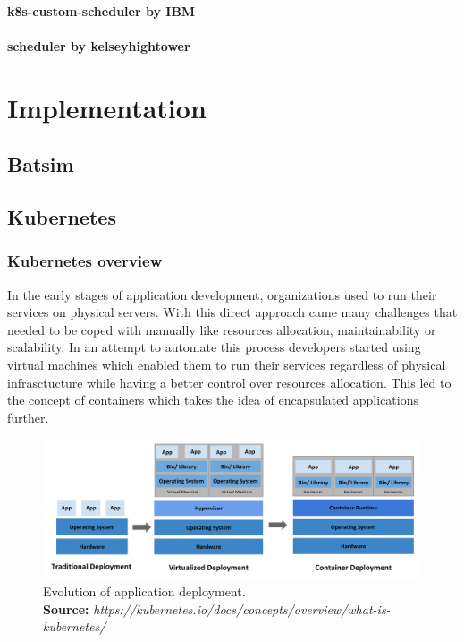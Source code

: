\documentclass[12pt, a4paper]{memoir}
\newcommand*{\captionsource}[2]{%
    \caption[{#1}]{%
        #1%
        \\\hspace{\linewidth}%
	\textbf{Source:} \textit{#2}%
    }%
}
\begin{document}
\subsubsection*{k8s-custom-scheduler by IBM}
\subsubsection*{scheduler by kelseyhightower}

\chapter{Implementation}
\section{Batsim}

\section{Kubernetes}
\subsection*{Kubernetes overview}
In the early stages of application development, organizations used to run their
services on physical servers. With this direct approach came many challenges
that needed to be coped with manually like resources allocation,
maintainability or scalability. In an attempt to automate this process
developers started using virtual machines which enabled them to run their
services regardless of physical infrasctucture while having a better control
over resources allocation.  This led to the concept of containers which takes
the idea of encapsulated applications further.

\begin{figure}[h]
	\centering
	\includegraphics[width=\textwidth]{./imgs/container_evolution.png}
	\captionsource{Evolution of application deployment.}{https://kubernetes.io/docs/concepts/overview/what-is-kubernetes/}
	\label{fig:container-evolution}
\end{figure}
\end{document}
